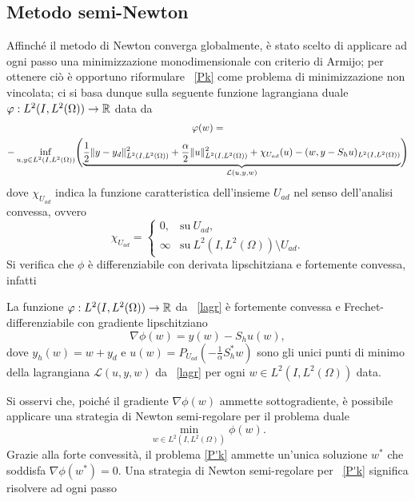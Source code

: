 \subsection{Metodo semi-Newton}
Affinché il metodo di Newton converga globalmente, è stato scelto di applicare ad ogni passo una minimizzazione monodimensionale con criterio di Armijo; per ottenere ciò è opportuno riformulare ~\eqref{Pk} come problema di minimizzazione non vincolata; ci si basa dunque sulla seguente funzione lagrangiana duale $ \varphi:L^2(I,L^2(\Omega))\to \mathbb{R} $ data da
\begin{multline}
\label{lagr}
\varphi(w)= \\
-\inf_{u,y\in L^2(I,L^2(\Omega))}\Biggl( \underbrace{\frac{1}{2}\lVert y-y_d\rVert^2_{L^2(I,L^2(\Omega))} + \frac{\alpha}{2}\lVert u\rVert^2_{L^2(I,L^2(\Omega))}  + \chi_{U_{ad}}(u) - (w,y-S_hu)_{L^2(I,L^2(\Omega))}}_{\mathcal{L}(u,y,w)}\Biggr)
\end{multline}
dove $ \chi_{U_{ad}} $ indica la funzione caratteristica dell'insieme $ U_{ad} $ nel senso dell'analisi convessa, ovvero
\begin{equation}
\chi_{U_{ad}}=
\begin{cases}
0,        &\text{su} \ U_{ad},\\
\infty   &\text{su} \ L^2(I,L^2(\Omega))\setminus U_{ad}.
\end{cases}
\end{equation}
Si verifica che $ \phi $ è differenziabile con derivata lipschitziana e fortemente convessa, infatti
\begin{lemma}
\label{phi}
La funzione $ \varphi:L^2(I,L^2(\Omega))\to\mathbb{R} $ da ~\eqref{lagr} è fortemente convessa e Frechet-differenziabile con gradiente lipschitziano
\begin{equation}
\nabla\phi(w)=y(w)-S_hu(w),
\end{equation}
dove $ y_h(w)=w+y_d $ e $ u(w)=P_{U_{ad}}(-\frac{1}{\alpha}S^*_hw) $ sono gli unici punti di minimo della lagrangiana $ \mathcal{L}(u,y,w) $ da ~\eqref{lagr} per ogni $ w\in L^2(I,L^2(\Omega)) $ data.
\end{lemma}
Si osservi che, poiché il gradiente $ \nabla\phi(w) $ ammette sottogradiente, è possibile applicare una strategia di Newton semi-regolare per il problema duale 
\begin{equation}
\label{P'k}
\min_{w\in L^2(I,L^2(\Omega))} \phi(w).
\end{equation}
Grazie alla forte convessità, il problema \eqref{P'k} ammette un'unica soluzione $ w^* $ che soddisfa $ \nabla\phi(w^*)=0 $.
Una strategia di Newton semi-regolare per ~\eqref{P'k} significa risolvere ad ogni passo
